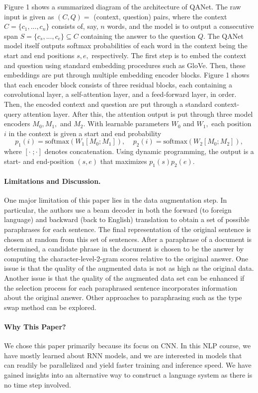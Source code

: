 \documentclass{article}
\begin{document}
Figure 1 shows a summarized diagram of the architecture of QANet. The raw input is given as $(C,Q)=$ (context, question) pairs, where the context $C=\{c_1,...,c_n\}$ consists of, say, $n$ words, and the model is to output a consecutive span $S=\{c_s,...,c_e\}\subseteq C$ containing the answer to the question $Q.$ The QANet model itself outputs softmax probabilities of each word in the context being the start and end positions $s,e,$ respectively. The first step is to embed the context and question using standard embedding procedures such as GloVe. Then, these embeddings are put through multiple embedding encoder blocks. Figure 1 shows that each encoder block consists of three residual blocks, each containing a convolutional layer, a self-attention layer, and a feed-forward layer, in order. Then, the encoded context and question are put through a standard context-query attention layer. After this, the attention output is put through three model encoders $M_0, M_1,$ and $M_2.$ With learnable parameters $W_0$ and $W_1,$ each position $i$ in the context is given a start and end probability
$$p_1(i)=\text{softmax}(W_1[M_0;M_1]),\;\;\;\; p_2(i)=\text{softmax}(W_2[M_0;M_2]),$$
where $[\cdot \;; \cdot]$ denotes concatenation. Using dynamic programming, the output is a start- and end-position $(s,e)$ that maximizes $p_1(s)p_2(e).$

\paragraph{Limitations and Discussion.}
One major limitation of this paper lies in the data augmentation step. In particular, the authors use a beam decoder in both the forward (to foreign language) and backward (back to English) translation to obtain a set of possible paraphrases for each sentence. The final representation of the original sentence is chosen at random from this set of sentences. After a paraphrase of a document is determined, a candidate phrase in the document is chosen to be the answer by computing the character-level-2-gram scores relative to the original answer. One issue is that the quality of the augmented data is not as high as the original data. Another issue is that the quality of the augmented data set can be enhanced if the selection process for each paraphrased sentence incorporates information about the original answer. Other approaches to paraphrasing such as the type swap method \cite{RM} can be explored.


\paragraph{Why This Paper?}
We chose this paper primarily because its focus on CNN. In this NLP course, we have mostly learned about RNN models, and we are interested in models that can readily be parallelized and yield faster training and inference speed. We have gained insights into an alternative way to construct a language system as there is no time step involved. 
\end{document}
